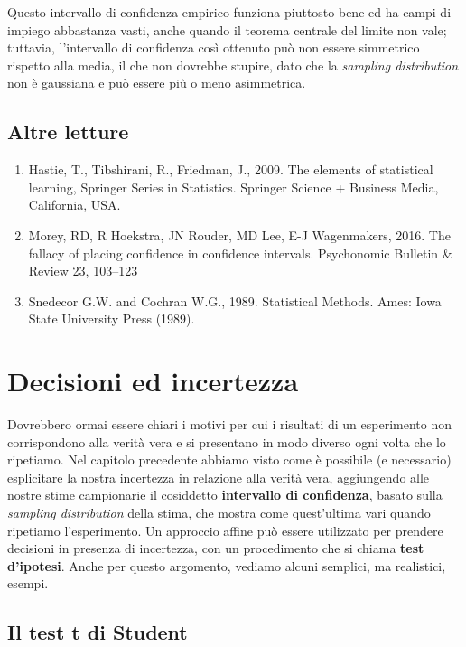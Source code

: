 \documentclass[a4paper,12pt,oneside]{book}
\providecommand{\tightlist}{%
  \setlength{\itemsep}{0pt}\setlength{\parskip}{0pt}}
\begin{document}
Questo intervallo di confidenza empirico funziona piuttosto bene ed ha campi di impiego abbastanza vasti, anche quando il teorema centrale del limite non vale; tuttavia, l'intervallo di confidenza così ottenuto può non essere simmetrico rispetto alla media, il che non dovrebbe stupire, dato che la \emph{sampling distribution} non è gaussiana e può essere più o meno asimmetrica.

\hypertarget{altre-letture-4}{%
\section{Altre letture}\label{altre-letture-4}}

\begin{enumerate}
\def\labelenumi{\arabic{enumi}.}
\tightlist
\item
  Hastie, T., Tibshirani, R., Friedman, J., 2009. The elements of statistical learning, Springer Series in Statistics. Springer Science + Business Media, California, USA.
\item
  Morey, RD, R Hoekstra, JN Rouder, MD Lee, E-J Wagenmakers, 2016. The fallacy of placing confidence in confidence intervals. Psychonomic Bulletin \& Review 23, 103--123
\item
  Snedecor G.W. and Cochran W.G., 1989. Statistical Methods. Ames: Iowa State University Press (1989).
\end{enumerate}

\hypertarget{decisioni-ed-incertezza}{%
\chapter{Decisioni ed incertezza}\label{decisioni-ed-incertezza}}

Dovrebbero ormai essere chiari i motivi per cui i risultati di un esperimento non corrispondono alla verità vera e si presentano in modo diverso ogni volta che lo ripetiamo. Nel capitolo precedente abbiamo visto come è possibile (e necessario) esplicitare la nostra incertezza in relazione alla verità vera, aggiungendo alle nostre stime campionarie il cosiddetto \textbf{intervallo di confidenza}, basato sulla \emph{sampling distribution} della stima, che mostra come quest'ultima vari quando ripetiamo l'esperimento. Un approccio affine può essere utilizzato per prendere decisioni in presenza di incertezza, con un procedimento che si chiama \textbf{test d'ipotesi}. Anche per questo argomento, vediamo alcuni semplici, ma realistici, esempi.

\hypertarget{il-test-t-di-student}{%
\section{Il test t di Student}\label{il-test-t-di-student}}
\end{document}
